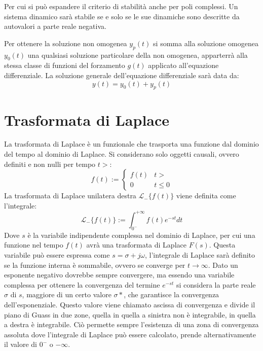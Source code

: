 \documentclass{article}
\numberwithin{equation}{subsection}
\begin{document}
Per cui si può espandere il criterio di stabilità anche per poli complessi. Un sistema dinamico sarà stabile se e solo se le sue dinamiche sono descritte da autovalori 
a parte reale negativa. 

Per ottenere la soluzione non omogenea $y_p(t)$ si somma alla soluzione omogenea $y_0(t)$ una qualsiasi soluzione particolare della non omogenea, apparterrà alla stessa classe 
di funzioni del forzamento $g(t)$ applicato all'equazione differenziale. La soluzione generale dell'equazione differenziale sarà data da:
\begin{equation}
    y(t)=y_0(t)+y_p(t)
\end{equation}

\clearpage

\section{Trasformata di Laplace}

La trasformata di Laplace è un funzionale che trasporta una funzione dal dominio del tempo al dominio di Laplace. Si considerano solo oggetti 
causali, ovvero definiti e non nulli per tempo $t>$:
\begin{equation}
    f(t):=
    \begin{cases}
        f(t) &t>\\
        0 &t\leq0
    \end{cases}
\end{equation}    
La trasformata di Laplace unilatera destra $\mathscr{L}_-\{f(t)\}$ viene definita come l'integrale: 
\begin{equation}
    \mathscr{L}_-\{f(t)\}:=\displaystyle\int_{0^-}^{+\infty}f(t)e^{-st}dt
\end{equation}
Dove $s$ è la variabile indipendente complessa nel dominio di Laplace, per cui una funzione nel tempo $f(t)$ avrà una trasformata di Laplace $F(s)$. 
Questa variabile può essere espressa come $s=\sigma+j\omega$, l'integrale di Laplace sarà definito se la funzione interna è sommabile, ovvero se converge per $t\to\infty$. 
Dato un esponente negativo dovrebbe sempre convergere, ma essendo una variabile complessa per ottenere la convergenza del termine $e^{-st}$ si considera la parte reale $\sigma$
di $s$, maggiore di un certo valore $\sigma*$, che garantisce la convergenza dell'esponenziale. Questo valore viene chiamato ascissa di convergenza e divide il piano di Guass 
in due zone, quella in quella a sinistra non è integrabile, in quella a destra è integrabile. Ciò permette sempre l'esistenza di una zona di convergenza assoluta dove l'integrale 
di Laplace può essere calcolato, prende alternativamente il valore di $0^-$ o $-\infty$. 
\end{document}
